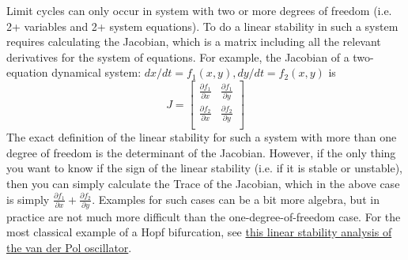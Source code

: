 \documentclass[12pt]{article}
\theoremstyle{definition}
\begin{document}
Limit cycles can only occur in system with two or more degrees of freedom (i.e. 2+ variables and 2+ system equations).  To do a linear stability in such a system requires calculating the Jacobian, which is a matrix including all the relevant derivatives for the system of equations. For example, the Jacobian of a two-equation dynamical system: $dx/dt = f_1(x,y), dy/dt = f_2(x,y)$ is 
\begin{equation}
J =
\begin{bmatrix}
  \frac{\partial f_1}{\partial x} & 
    \frac{\partial f_1}{\partial y} \\[1ex] %
  \frac{\partial f_2}{\partial x} & 
    \frac{\partial f_2}{\partial y} \\[1ex]
\end{bmatrix}
\end{equation}
The exact definition of the linear stability for such a system with more than one degree of freedom is the determinant of the Jacobian. However, if the only thing you want to know if the sign of the linear stability (i.e. if it is stable or unstable), then you can simply calculate the Trace of the Jacobian, which in the above case is simply $\frac{\partial f_1}{\partial x} +  \frac{\partial f_2}{\partial y}$. Examples for such cases can be a bit more algebra, but in practice are not much more difficult than the one-degree-of-freedom case. For the most classical example of a Hopf bifurcation, see \href{https://en.wikipedia.org/wiki/Hopf_bifurcation#Propositions}{this linear stability analysis of the van der Pol oscillator}.

%
%
\end{document}
